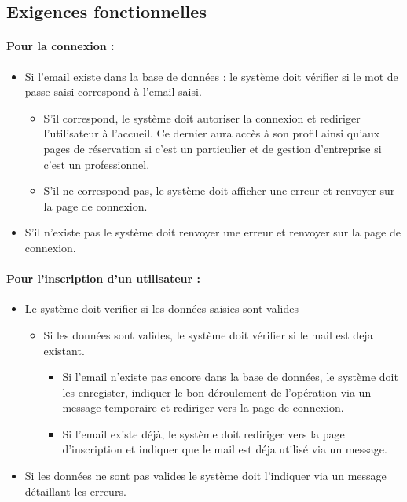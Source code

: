 \documentclass{article}
\begin{document}
\subsection{Exigences fonctionnelles}
\paragraph{Pour la connexion : }

\begin{itemize}
\item Si l'email existe dans la base de données :
	le système doit vérifier si le mot de passe saisi
	correspond à l'email saisi.
		\begin{itemize}
		\item S'il correspond, le système doit autoriser la connexion et
			rediriger l'utilisateur à l'accueil. Ce dernier aura accès à son
			profil ainsi qu'aux pages de réservation si c'est un particulier et de gestion d'entreprise
			si c'est un professionnel.
		\item S'il ne correspond pas, le système doit afficher une erreur
			et renvoyer sur la page de connexion.
		\end{itemize}
\item S'il n'existe pas le système doit renvoyer une erreur
	et renvoyer sur la page de connexion.
\end{itemize}


\paragraph{Pour l'inscription d'un utilisateur : }
\begin{itemize}
\item Le système doit verifier si les données saisies sont valides
	\begin{itemize}
	\item Si les données sont valides, le système doit vérifier si le mail
		est deja existant.
		\begin{itemize}
		\item Si l'email n'existe pas encore dans la base de données, le système
			doit les enregister, indiquer le bon déroulement de l'opération via un message temporaire et rediriger
			 vers la page de connexion.
		\item Si l'email existe déjà, le système doit rediriger vers
			la page d'inscription et indiquer que le mail est déja utilisé
			via un message.
		\end{itemize}
	\end{itemize}
\item Si les données ne sont pas valides le système doit l'indiquer
	via un message détaillant les erreurs.
\end{itemize}
\end{document}
